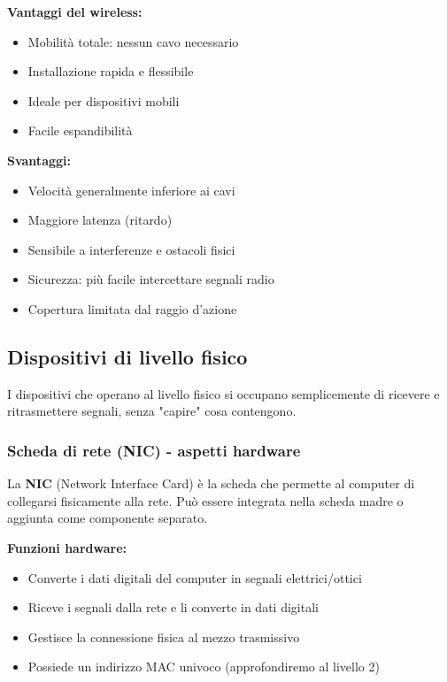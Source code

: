 \documentclass[12pt,a4paper]{article}
\begin{document}
\textbf{Vantaggi del wireless:}
\begin{itemize}
    \item Mobilità totale: nessun cavo necessario
    \item Installazione rapida e flessibile
    \item Ideale per dispositivi mobili
    \item Facile espandibilità
\end{itemize}

\textbf{Svantaggi:}
\begin{itemize}
    \item Velocità generalmente inferiore ai cavi
    \item Maggiore latenza (ritardo)
    \item Sensibile a interferenze e ostacoli fisici
    \item Sicurezza: più facile intercettare segnali radio
    \item Copertura limitata dal raggio d'azione
\end{itemize}

\subsection{Dispositivi di livello fisico}

I dispositivi che operano al livello fisico si occupano semplicemente di ricevere e ritrasmettere segnali, senza "capire" cosa contengono.

\subsubsection{Scheda di rete (NIC) - aspetti hardware}

La \textbf{NIC} (Network Interface Card) è la scheda che permette al computer di collegarsi fisicamente alla rete. Può essere integrata nella scheda madre o aggiunta come componente separato.

\textbf{Funzioni hardware:}
\begin{itemize}
    \item Converte i dati digitali del computer in segnali elettrici/ottici
    \item Riceve i segnali dalla rete e li converte in dati digitali
    \item Gestisce la connessione fisica al mezzo trasmissivo
    \item Possiede un indirizzo MAC univoco (approfondiremo al livello 2)
\end{itemize}
\end{document}
